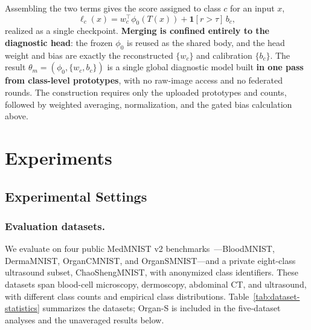\documentclass[journal,twoside,web]{ieeecolor}
\begin{document}
Assembling the two terms gives the score assigned to class $c$ for an input $x$,
\begin{equation}
\ell_c(x)=w_c^{\top}\phi_0(T(x))+\mathbf{1}[r>\tau]\,b_c,
\label{eq:score}
\end{equation}
realized as a single checkpoint. \textbf{Merging is confined entirely to the diagnostic head}: the frozen $\phi_0$ is reused as the shared body, and the head weight and bias are exactly the reconstructed $\{w_c\}$ and calibration $\{b_c\}$. The result $\theta_m=(\phi_0,\{w_c,b_c\})$ is a single global diagnostic model built \textbf{in one pass from class-level prototypes}, with no raw-image access and no federated rounds.
The construction requires only the uploaded prototypes and counts, followed by weighted averaging, normalization, and the gated bias calculation above.



\section{Experiments}

\subsection{Experimental Settings}

\subsubsection{Evaluation datasets.}

We evaluate on four public MedMNIST v2 benchmarks~\cite{yang2023medmnist}---BloodMNIST, DermaMNIST, OrganCMNIST, and OrganSMNIST---and a private eight-class ultrasound subset, ChaoShengMNIST, with anonymized class identifiers. These datasets span blood-cell microscopy, dermoscopy, abdominal CT, and ultrasound, with different class counts and empirical class distributions. Table~\ref{tab:dataset-statistics} summarizes the datasets; Organ-S is included in the five-dataset analyses and the unaveraged results below.
\end{document}
